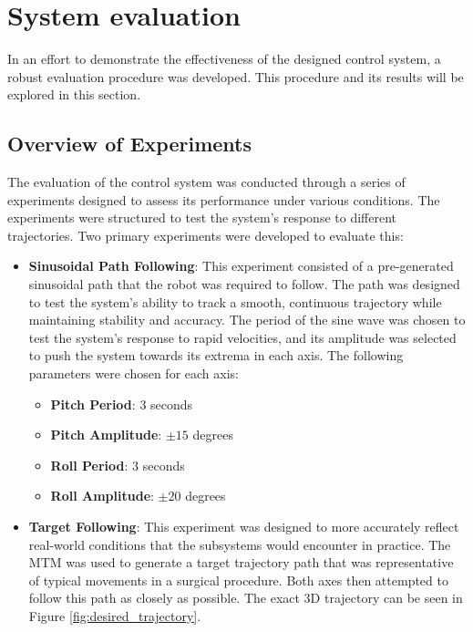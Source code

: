 \chapter{System evaluation}
\label{chapter:results}

In an effort to demonstrate the effectiveness of the designed control system, a robust evaluation procedure was developed. This procedure and its results will be explored in this section.


\section{Overview of Experiments}
\label{section:experiment_overview}

The evaluation of the control system was conducted through a series of experiments designed to assess its performance under various conditions. The experiments were structured to test the system's response to different trajectories. Two primary experiments were developed to evaluate this:

\begin{itemize}
    \item \textbf{Sinusoidal Path Following}: This experiment consisted of a pre-generated sinusoidal path that the robot was required to follow. The path was designed to test the system's ability to track a smooth, continuous trajectory while maintaining stability and accuracy. The period of the sine wave was chosen to test the system's response to rapid velocities, and its amplitude was selected to push the system towards its extrema in each axis. The following parameters were chosen for each axis:
    \begin{itemize}
        \item \textbf{Pitch Period}: 3 seconds
        \item \textbf{Pitch Amplitude}: $\pm 15$ degrees
        \item \textbf{Roll Period}: 3 seconds
        \item \textbf{Roll Amplitude}: $\pm 20$ degrees
    \end{itemize}
    
    \item \textbf{Target Following}: This experiment was designed to more accurately reflect real-world conditions that the subsystems would encounter in practice. The MTM was used to generate a target trajectory path that was representative of typical movements in a surgical procedure. Both axes then attempted to follow this path as closely as possible. The exact 3D trajectory can be seen in Figure \ref{fig:desired_trajectory}.
\end{itemize}

